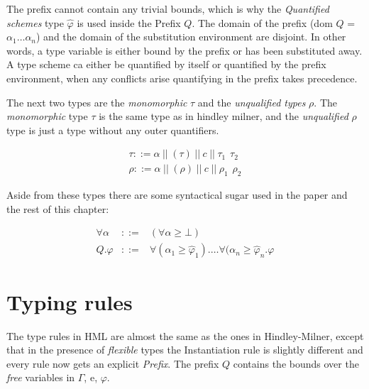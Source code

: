 The prefix cannot contain any trivial bounds, which is why the \emph{Quantified schemes} type $\hat{\varphi}$ is used inside the Prefix $Q$. The domain of the prefix (dom $Q$ = ${\alpha_1 \ldots \alpha_n}$) and the domain of the substitution environment are disjoint. In other words, a type variable is either bound by the prefix or has been substituted away. A type scheme ca either be quantified by itself or quantified by the prefix environment, when any conflicts arise quantifying in the prefix takes precedence.

The next two types are the \emph{monomorphic} $\tau$ and the \emph{unqualified types} $\rho$. The \emph{monomorphic} type $\tau$ is the same type as in hindley milner, and the \emph{unqualified} $\rho$ type is just a type without any outer quantifiers. 

\begin{eqnarray*}
\tau  ::= \alpha \hspace{3pt} || \hspace{3pt} (\tau) \hspace{3pt} || \hspace{3pt} c \hspace{3pt} || \hspace{3pt} \tau_1 \hspace{5pt} \tau_2 \\
\rho  ::= \alpha \hspace{3pt} || \hspace{3pt} (\rho) \hspace{3pt} || \hspace{3pt} c \hspace{3pt} || \hspace{3pt} \rho_1 \hspace{5pt} \rho_2
\end{eqnarray*}

Aside from these types there are some syntactical sugar used in the paper and the rest of this chapter:
\label{syntax}

\begin{eqnarray*}
\forall \alpha & ::= & (\forall \alpha \geq \bot) \\
Q.\varphi & ::= & \forall(\alpha_1 \geq \hat{\varphi}_1). \ldots \forall(\alpha_n \geq \hat{\varphi}_n . \varphi
\end{eqnarray*}

\section{Typing rules}
The type rules in HML are almost the same as the ones in Hindley-Milner, except that in the presence of \textit{flexible} types the Instantiation rule is slightly different and every rule now gets an explicit \textit{Prefix}. The prefix $Q$ contains the bounds over the \emph{free} variables in $\Gamma$, e, $\varphi$.

